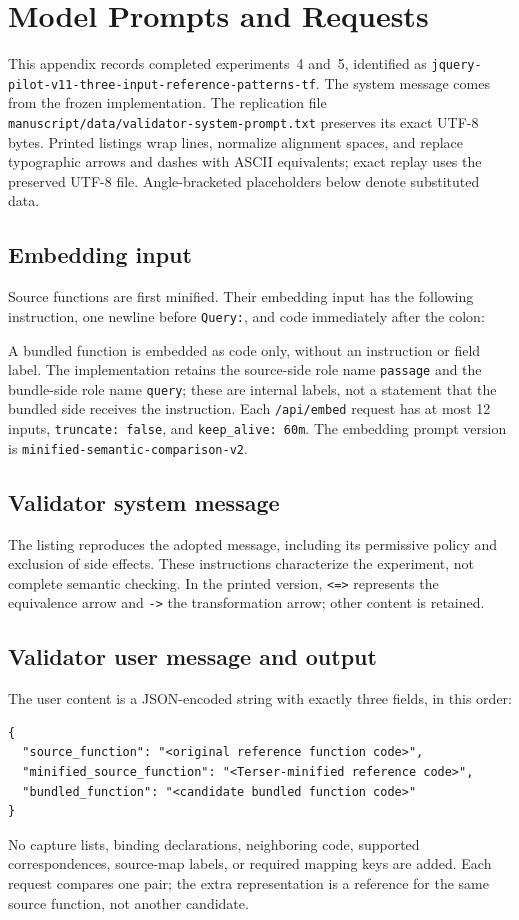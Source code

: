 \section{Model Prompts and Requests}
\label{sec:prompt}
This appendix records completed experiments~4 and~5, identified as \nolinkurl{jquery-pilot-v11-three-input-reference-patterns-tf}. The system message comes from the frozen implementation. The replication file \nolinkurl{manuscript/data/validator-system-prompt.txt} preserves its exact UTF-8 bytes. Printed listings wrap lines, normalize alignment spaces, and replace typographic arrows and dashes with ASCII equivalents; exact replay uses the preserved UTF-8 file. Angle-bracketed placeholders below denote substituted data.

\subsection{Embedding input}
Source functions are first minified. Their embedding input has the following instruction, one newline before \texttt{Query:}, and code immediately after the colon:

A bundled function is embedded as code only, without an instruction or field label. The implementation retains the source-side role name \texttt{passage} and the bundle-side role name \texttt{query}; these are internal labels, not a statement that the bundled side receives the instruction. Each \nolinkurl{/api/embed} request has at most 12 inputs, \texttt{truncate: false}, and \texttt{keep\_alive: 60m}. The embedding prompt version is \nolinkurl{minified-semantic-comparison-v2}.

\subsection{Validator system message}
The listing reproduces the adopted message, including its permissive policy and exclusion of side effects. These instructions characterize the experiment, not complete semantic checking. In the printed version, \texttt{<=>} represents the equivalence arrow and \texttt{->} the transformation arrow; other content is retained.


\subsection{Validator user message and output}
The user content is a JSON-encoded string with exactly three fields, in this order:
\begin{lstlisting}
{
  "source_function": "<original reference function code>",
  "minified_source_function": "<Terser-minified reference code>",
  "bundled_function": "<candidate bundled function code>"
}
\end{lstlisting}
No capture lists, binding declarations, neighboring code, supported correspondences, source-map labels, or required mapping keys are added. Each request compares one pair; the extra representation is a reference for the same source function, not another candidate.

